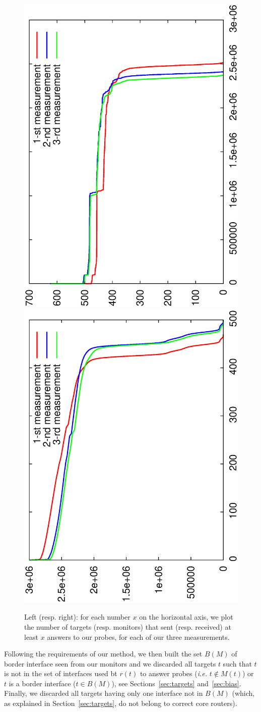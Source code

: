 \documentclass[conference]{IEEEtran}
\begin{document}
\begin{figure} \centering
\hfill \includegraphics[angle=-90,width=0.48\columnwidth]{figures/filter-monitors} \hfill \includegraphics[angle=-90,width=0.48\columnwidth]{figures/filter-targets} \hfill
\caption{Left (resp. right): for each number $x$ on the horizontal axis, we plot the number of targets (resp. monitors) that sent (resp. received) at least $x$ answers to our probes, for each of our three measurements.}
\label{fig:filters}
\end{figure}

Following the requirements of our method, we then built the set $B(M)$ of border interface seen from our monitors and we discarded all targets $t$ such that $t$ is not in the set of interfaces used bt $r(t)$ to answer probes ({\em i.e.} $t \not\in M(t)$) or $t$ is a border interface ($t \in B(M)$), see Sections~\ref{sec:targets} and~\ref{sec:bias}. Finally, we discarded all targets having only one interface not in $B(M)$ (which, as explained in Section~\ref{sec:targets}, do not belong to correct core routers).
\end{document}
